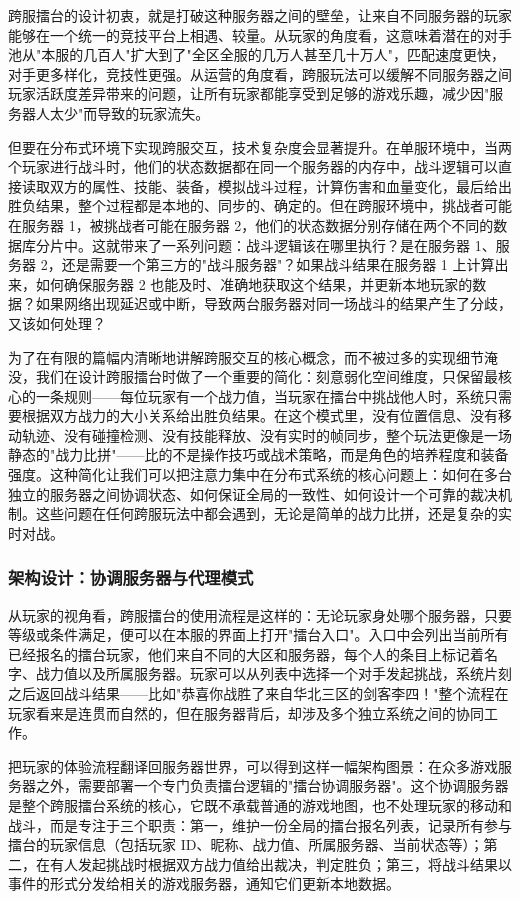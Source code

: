 跨服擂台的设计初衷，就是打破这种服务器之间的壁垒，让来自不同服务器的玩家能够在一个统一的竞技平台上相遇、较量。从玩家的角度看，这意味着潜在的对手池从"本服的几百人"扩大到了"全区全服的几万人甚至几十万人"，匹配速度更快，对手更多样化，竞技性更强。从运营的角度看，跨服玩法可以缓解不同服务器之间玩家活跃度差异带来的问题，让所有玩家都能享受到足够的游戏乐趣，减少因"服务器人太少"而导致的玩家流失。

但要在分布式环境下实现跨服交互，技术复杂度会显著提升。在单服环境中，当两个玩家进行战斗时，他们的状态数据都在同一个服务器的内存中，战斗逻辑可以直接读取双方的属性、技能、装备，模拟战斗过程，计算伤害和血量变化，最后给出胜负结果，整个过程都是本地的、同步的、确定的。但在跨服环境中，挑战者可能在服务器 1，被挑战者可能在服务器 2，他们的状态数据分别存储在两个不同的数据库分片中。这就带来了一系列问题：战斗逻辑该在哪里执行？是在服务器 1、服务器 2，还是需要一个第三方的"战斗服务器"？如果战斗结果在服务器 1 上计算出来，如何确保服务器 2 也能及时、准确地获取这个结果，并更新本地玩家的数据？如果网络出现延迟或中断，导致两台服务器对同一场战斗的结果产生了分歧，又该如何处理？

为了在有限的篇幅内清晰地讲解跨服交互的核心概念，而不被过多的实现细节淹没，我们在设计跨服擂台时做了一个重要的简化：刻意弱化空间维度，只保留最核心的一条规则——每位玩家有一个战力值，当玩家在擂台中挑战他人时，系统只需要根据双方战力的大小关系给出胜负结果。在这个模式里，没有位置信息、没有移动轨迹、没有碰撞检测、没有技能释放、没有实时的帧同步，整个玩法更像是一场静态的"战力比拼"——比的不是操作技巧或战术策略，而是角色的培养程度和装备强度。这种简化让我们可以把注意力集中在分布式系统的核心问题上：如何在多台独立的服务器之间协调状态、如何保证全局的一致性、如何设计一个可靠的裁决机制。这些问题在任何跨服玩法中都会遇到，无论是简单的战力比拼，还是复杂的实时对战。

\subsubsection{架构设计：协调服务器与代理模式}

从玩家的视角看，跨服擂台的使用流程是这样的：无论玩家身处哪个服务器，只要等级或条件满足，便可以在本服的界面上打开"擂台入口"。入口中会列出当前所有已经报名的擂台玩家，他们来自不同的大区和服务器，每个人的条目上标记着名字、战力值以及所属服务器。玩家可以从列表中选择一个对手发起挑战，系统片刻之后返回战斗结果——比如"恭喜你战胜了来自华北三区的剑客李四！"整个流程在玩家看来是连贯而自然的，但在服务器背后，却涉及多个独立系统之间的协同工作。

把玩家的体验流程翻译回服务器世界，可以得到这样一幅架构图景：在众多游戏服务器之外，需要部署一个专门负责擂台逻辑的"擂台协调服务器"。这个协调服务器是整个跨服擂台系统的核心，它既不承载普通的游戏地图，也不处理玩家的移动和战斗，而是专注于三个职责：第一，维护一份全局的擂台报名列表，记录所有参与擂台的玩家信息（包括玩家 ID、昵称、战力值、所属服务器、当前状态等）；第二，在有人发起挑战时根据双方战力值给出裁决，判定胜负；第三，将战斗结果以事件的形式分发给相关的游戏服务器，通知它们更新本地数据。

